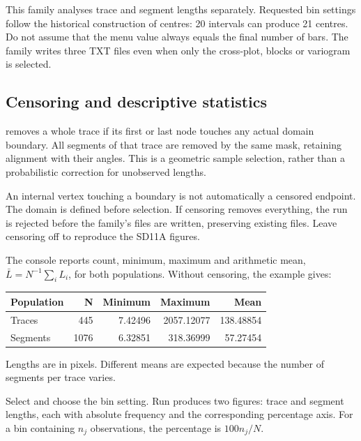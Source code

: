 \label{sec:lengths}
This family analyses trace and segment lengths separately. Requested bin settings follow the historical construction of centres: 20 intervals can produce 21 centres. Do not assume that the menu value always equals the final number of bars. The family writes three TXT files even when only the cross-plot, blocks or variogram is selected.

\subsection{Censoring and descriptive statistics}
 removes a whole trace if its first or last node touches any actual domain boundary. All segments of that trace are removed by the same mask, retaining alignment with their angles. This is a geometric sample selection, rather than a probabilistic correction for unobserved lengths.

An internal vertex touching a boundary is not automatically a censored endpoint. The domain is defined before selection. If censoring removes everything, the run is rejected before the family's files are written, preserving existing files. Leave censoring off to reproduce the SD11A figures.

The console reports count, minimum, maximum and arithmetic mean, \(\bar L=N^{-1}\sum_i L_i\), for both populations. Without censoring, the example gives:
\begin{center}\begin{tabular}{@{}lrrrr@{}}\toprule
Population & N & Minimum & Maximum & Mean\\\midrule
Traces &445&7.42496&2057.12077&138.48854\\
Segments &1076&6.32851&318.36999&57.27454\\\bottomrule
\end{tabular}\end{center}
Lengths are in pixels. Different means are expected because the number of segments per trace varies.

Select  and choose the bin setting. Run produces two figures: trace and segment lengths, each with absolute frequency and the corresponding percentage axis. For a bin containing \(n_j\) observations, the percentage is \(100n_j/N\).

